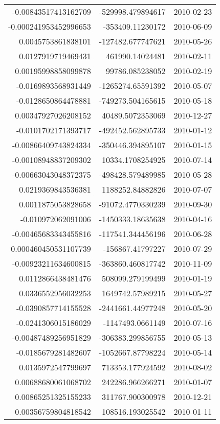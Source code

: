 \begin{tabular}{r | r | l}
-0.00843517413162709 & -529998.479894617 & 2010-02-23 \\
-0.000241953452996653 & -353409.11230172 & 2010-06-09 \\
0.0045753861838101 & -127482.677747621 & 2010-05-26 \\
0.0127919719469431 & 461990.14024481 & 2010-02-11 \\
0.00195998858099878 & 99786.085238052 & 2010-02-19 \\
-0.0169893568931449 & -1265274.65591392 & 2010-05-07 \\
-0.0128650864478881 & -749273.504165615 & 2010-05-18 \\
0.00347927026208152 & 40489.5072353069 & 2010-12-27 \\
-0.0101702171393717 & -492452.562895733 & 2010-01-12 \\
-0.00866409743824334 & -350446.394895107 & 2010-01-15 \\
-0.00108948837209302 & 10334.1708254925 & 2010-07-14 \\
-0.00663043048372375 & -498428.579489985 & 2010-05-28 \\
0.0219369843536381 & 1188252.84882826 & 2010-07-07 \\
0.0011875053828658 & -91072.4770330239 & 2010-09-30 \\
-0.010972062091006 & -1450333.18635638 & 2010-04-16 \\
-0.00465683343455816 & -117541.344456196 & 2010-06-28 \\
0.000460450531107739 & -156867.41797227 & 2010-07-29 \\
-0.00923211634600815 & -363860.460817742 & 2010-11-09 \\
0.0112866438481476 & 508099.279199499 & 2010-01-19 \\
0.0336552956032253 & 1649742.57989215 & 2010-05-27 \\
-0.0390857714155528 & -2441661.44977248 & 2010-05-20 \\
-0.0241306015186029 & -1147493.0661149 & 2010-07-16 \\
-0.00487489256951829 & -306383.299856755 & 2010-05-13 \\
-0.0185679281482607 & -1052667.87798224 & 2010-05-14 \\
0.0135972547799697 & 713353.177924592 & 2010-08-02 \\
0.00688680061068702 & 242286.966266271 & 2010-01-07 \\
0.00865251325155233 & 311767.900300978 & 2010-12-21 \\
0.00356759804818542 & 108516.193025542 & 2010-01-11 \\

\end{tabular}
